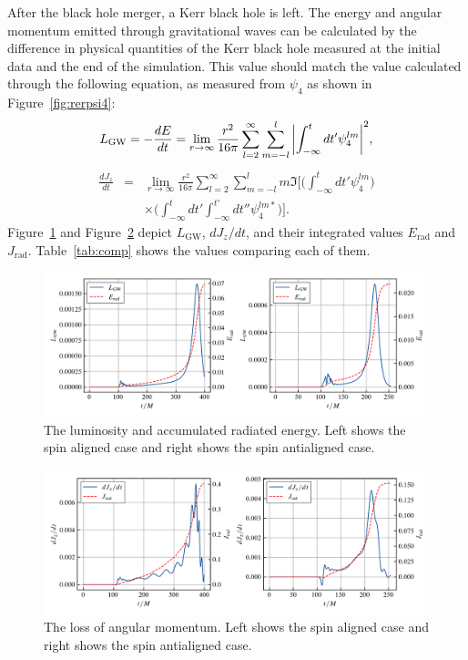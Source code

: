 \documentclass[noamssymb]{beamer}
\newlength{\colwidth}
\begin{document}
\begin{frame}[t]
\begin{columns}[t]
\begin{column}{\colwidth}
\begin{block}{}
	After the black hole merger, a Kerr black hole is left. The energy and angular momentum emitted through gravitational waves can be calculated by the difference in physical quantities of the Kerr black hole measured at the initial data and the end of the simulation. This value should match the value calculated through the following equation, as measured from $\psi_4$ as shown in Figure~\ref{fig:rerpsi4}:
	\begin{eqnarray}
		L_\mathrm{GW} = - \frac{dE}{dt} = \lim_{r\to\infty}{\frac{r^2}{16\pi}\sum_{l=2}^{\infty}\sum_{m=-l}^{l}\qty|\int_{-\infty}^{t}dt'\psi_4^{lm}|^2},
	\end{eqnarray}
	\begin{eqnarray}
		\frac{dJ_z}{dt}&=&\lim_{r\to\infty} \frac{r^2}{16\pi}\sum_{l=2}^{\infty}\sum_{m=-l}^{l}m \Im \biggl[\biggl(\int_{-\infty}^{t}dt'\psi_4^{lm}\biggr) \nonumber\\ &&\times \biggr( \int_{-\infty}^tdt'\int_{-\infty}^{t'}dt''\psi_4^{lm\ast} \biggr)\biggr].
	\end{eqnarray}
	Figure~\ref{fig:erad} and Figure~\ref{fig:jrad} depict $L_\mathrm{GW}$, $dJ_z/dt$, and their integrated values $E_\mathrm{rad}$ and $J_\mathrm{rad}$. Table~\ref{tab:comp} shows the values comparing each of them.
	\begin{figure}
		\centering
		\includegraphics[width=\columnwidth]{img/erad}
		\caption{\label{fig:erad}The luminosity and accumulated radiated energy. Left shows the spin aligned case and right shows the spin antialigned case.}
	\end{figure}
	
	\begin{figure}
		\centering
		\includegraphics[width=\columnwidth]{img/jrad}
		\caption{\label{fig:jrad}The loss of angular momentum. Left shows the spin aligned case and right shows the spin antialigned case.}
	\end{figure}
	

\end{block}
\end{column}
\end{columns}
\end{frame}
\end{document}
